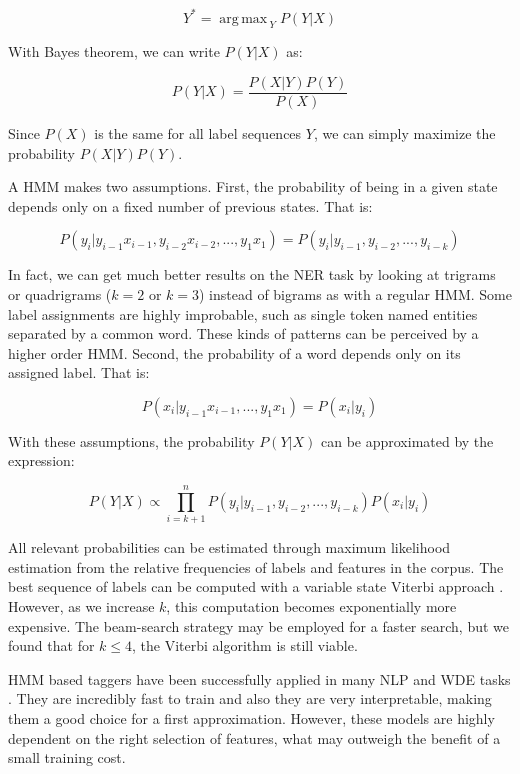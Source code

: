\documentclass{nle}
\DeclareMathOperator*{\argmax}{arg\,max\,}
\begin{document}
\begin{equation}
Y^* = \argmax_{Y} P(Y|X)
\end{equation}

With Bayes theorem, we can write $ P(Y|X) $ as:

\begin{equation}
P(Y|X) = \frac{P(X|Y) P(Y)}{P(X)}
\end{equation}

Since $ P(X) $ is the same for all label sequences $ Y $, we can simply maximize
the probability $ P(X|Y) P(Y) $.

A HMM makes two assumptions. First, the probability of being in a given state depends 
only on a fixed number of previous states. That is:

\begin{equation}
P(y_i|y_{i-1}x_{i-1}, y_{i-2}x_{i-2}, ..., y_1x_1) = P(y_i|y_{i-1}, y_{i-2},..., y_{i-k})
\end{equation}

In fact, we can get much better results on the NER task by looking at trigrams
or quadrigrams ($ k = 2 $ or $ k = 3 $) instead of bigrams as with a regular HMM. 
Some label assignments are highly improbable, such as single token named entities 
separated by a common word. These kinds of patterns can be perceived by a higher order HMM.
Second, the probability of a word depends only on its assigned label. That is:

\begin{equation}
P(x_i|y_{i-1}x_{i-1}, ..., y_1x_1) = P(x_i|y_i)
\end{equation}

With these assumptions, 
the probability $ P(Y|X) $ can be approximated by the expression:

\begin{equation}
P(Y|X) \propto \prod_{i=k+1}^{n} P(y_i|y_{i-1}, y_{i-2}, ..., y_{i-k}) P(x_i|y_i)
\end{equation}

All relevant probabilities can be estimated through maximum likelihood estimation from the relative
frequencies of labels and features in the corpus. The best sequence of labels can be computed 
with a variable state Viterbi approach \cite{Li2000}. However, as we increase $ k $, this computation 
becomes exponentially more expensive. The beam-search strategy may be employed for a faster 
search, but we found that for $ k \leq 4 $, the Viterbi algorithm is still viable.

HMM based taggers have been successfully applied in many NLP and WDE tasks 
\cite{Rabiner1990,Leek1997,Freitag2000}. They are incredibly fast to train and also they are very 
interpretable, making them a good choice for a first approximation. However, these models 
are highly dependent on the right selection of features, what may outweigh the benefit of a 
small training cost.
\end{document}

